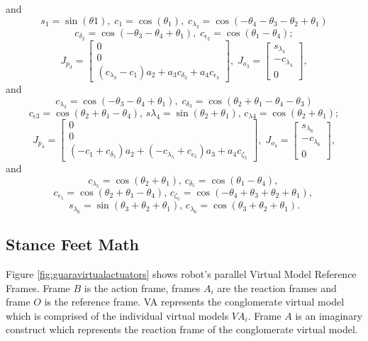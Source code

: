 \documentclass[]{article}
\begin{document}
and
\[s_1=\sin(\theta1),\;c_1=\cos(\theta_1),\;c_{\lambda_2}=\cos(-\theta_4-\theta_3-\theta_2+\theta_1)\]
\[c_{\delta_{2}}= \cos(-\theta_3-\theta_4+\theta_1),\; c_{\epsilon_2}=\cos(\theta_1-\theta_4);\]
\begin{equation}
J_{p_3}=
\begin{bmatrix}
0\\ 0\\
\left( c_{{\lambda_{{3}}}}-c_{{1}} \right) a_{{2}}+a_{{3}}c_{{\delta_
		{{3}}}}+a_{{4}}c_{{\epsilon_{{3}}}} 
\end{bmatrix},
\;J_{o_3}=
\begin{bmatrix}
s_{{\lambda_{{4}}}}\\ -c_{{\lambda_{{4}}}}\\ 0 
\end{bmatrix},\nonumber
\end{equation}
and 
\[c_{\lambda_{3}}=\cos(-\theta_3-\theta_4+\theta_1),\; c_{\delta_{3}}=\cos(\theta_2+\theta_1-\theta_4-\theta_3)\] \[c_{\epsilon{3}}=\cos(\theta_2+\theta_1-\theta_4),\,s{\lambda_{4}}=\sin(\theta_2+\theta_1),\,c_{\lambda{4}}=\cos(\theta_2+\theta_1);\]
\begin{equation}
J_{p_4}=
\begin{bmatrix}
0\\ 0\\ \left( -c_{{1}}+c_{{\delta_{{5}}}} \right) a_{{2}}+ \left( -c_{{
		\lambda_{{5}}}}+c_{{\epsilon_{{5}}}} \right) a_{{3}}+a_{{4}}c_{{\zeta_
		{{5}}}} 
\end{bmatrix},\nonumber
\;J_{o_4}=
\begin{bmatrix}
s_{{\lambda_{{6}}}}\\ -c_{{\lambda_{{6}}}}\\ 0 
\end{bmatrix},
\end{equation}
and \[c_{\lambda_{5}}=\cos(\theta_2+\theta_1),\, c_{\delta_{5}}=\cos(\theta_1-\theta_4),\,\]\[c_{\epsilon_{5}}=\cos(\theta_2+\theta_1-\theta_4),\, c_{\zeta_{5}}=\cos(-\theta_4+\theta_3+\theta_2+\theta_1),\,\]\[s_{\lambda_{6}}=\sin(\theta_3+\theta_2+\theta_1),\,c_{\lambda_{6}}=\cos(\theta_3+\theta_2+\theta_1).\]\subsection{Stance Feet Math}
Figure \ref{fig:guaravirtualactuators} shows robot's  parallel Virtual Model Reference Frames. Frame $B$ is the action frame, frames $A_i$ 
are the reaction frames and frame $O$ is the reference frame. VA represents the conglomerate virtual model which is comprised of the individual virtual models $VA_i$. Frame $A$ is an imaginary construct which represents the reaction frame of the conglomerate virtual model.
\end{document}
